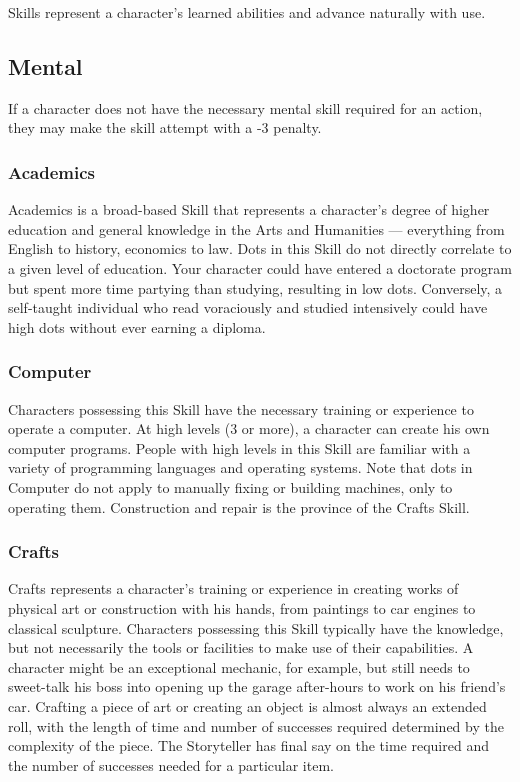 \documentclass["../Misguided by Starlight.tex"]{subfiles}
\begin{document}
Skills represent a character's learned abilities and advance naturally with use.

\subsection{Mental}
If a character does not have the necessary mental skill required for an action, they may make the skill attempt with a -3 penalty.

\subsubsection{Academics}
Academics is a broad-based Skill that represents a character's degree of higher education and general knowledge
in the Arts and Humanities --- everything from English to history, economics to law. Dots in this Skill do not directly correlate to a given level of education. Your character could have entered a doctorate program but spent more time partying than studying, resulting in low dots. Conversely, a self-taught individual who read voraciously and studied intensively could have high dots without
ever earning a diploma.

\subsubsection{Computer}
Characters possessing this Skill have the necessary training or experience to operate a computer. At high levels (3 or more), a character can create his own computer programs. People with high levels in this Skill are familiar with a variety of programming languages and operating systems. Note that dots in Computer do not apply to manually fixing or building machines, only to operating them. Construction and repair is the province of the Crafts Skill.

\subsubsection{Crafts}
Crafts represents a character’s training or experience in creating works of physical art or construction with his hands, from paintings to car engines to classical sculpture. Characters possessing this Skill typically have the knowledge, but not necessarily the tools or facilities to make use of their capabilities. A character might be an exceptional mechanic, for example, but still needs to sweet-talk his boss into opening up the garage after-hours to work on his friend’s car. Crafting a piece of art or creating an object is almost always an extended roll, with the length of time and number of successes required determined by the complexity of the piece. The Storyteller has final say on the time required and the number of successes needed for a particular item.
\end{document}
